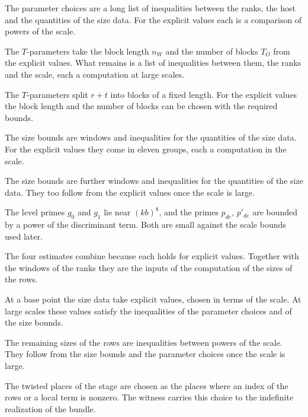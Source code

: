 The parameter choices are a long list of inequalities between the ranks, the host and the
quantities of the size data. For the explicit values each is a comparison of powers of the scale.

The $T$-parameters take the block length $n_W$ and the number of blocks $T_O$ from the explicit
values. What remains is a list of inequalities between them, the ranks and the scale, each a
computation at large scales.

The $T$-parameters split $r+t$ into blocks of a fixed length. For the explicit values the block
length and the number of blocks can be chosen with the required bounds.

The size bounds are windows and inequalities for the quantities of the size data. For the explicit
values they come in eleven groups, each a computation in the scale.

The size bounds are further windows and inequalities for the quantities of the size data. They
too follow from the explicit values once the scale is large.

The level primes $g_0$ and $g_1$ lie near $(kb)^8$, and the primes $p_{de}$, $p'_{de}$ are bounded
by a power of the discriminant term. Both are small against the scale bounds used later.

The four estimates combine because each holds for explicit values. Together with the windows of
the ranks they are the inputs of the computation of the sizes of the rows.

At a base point the size data take explicit values, chosen in terms of the
scale. At large scales these values satisfy the inequalities of the parameter
choices and of the size bounds.

The remaining sizes of the rows are inequalities between powers of the scale.
They follow from the size bounds and the parameter choices once the scale is
large.

The twisted places of the stage are chosen as the places where an index of the
rows or a local term is nonzero. The witness carries this choice to the
indefinite realization of the bundle.

